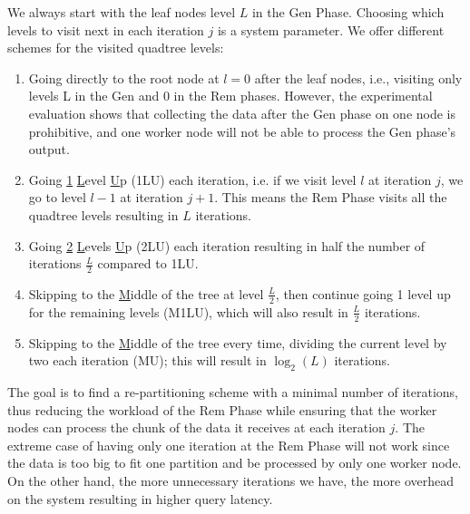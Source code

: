 We always start with the leaf nodes level $L$ in the Gen Phase. Choosing which levels to visit next in each iteration $j$ is a system parameter. 
We offer different schemes for the visited quadtree levels: 
\begin{enumerate}
    \item Going directly to the root node at $l=0$ after the leaf nodes, i.e., visiting only levels L in the Gen and 0 in the Rem phases. However, the experimental evaluation shows that collecting the data after the Gen phase on one node is prohibitive, and one worker node will not be able to process the Gen phase's output.
    \item Going \underline{1} \underline{L}evel \underline{U}p (1LU) each iteration, i.e. if we visit level $l$ at iteration $j$, we go to level $l-1$ at iteration $j+1$. This means the Rem Phase visits all the quadtree levels resulting in $L$ iterations.
    \item Going \underline{2} \underline{L}evels \underline{U}p (2LU) each iteration resulting in half the number of iterations $\frac{L}{2}$ compared to 1LU.
    \item Skipping to the \underline{M}iddle of the tree at level $\frac{L}{2}$, then continue going 1 level up for the remaining levels (M1LU), which will also result in $\frac{L}{2}$ iterations.
    \item Skipping to the \underline{M}iddle of the tree every time, dividing the current level by two each iteration (MU); this will result in $\log_2(L)$ iterations.
\end{enumerate}
The goal is to find a re-partitioning scheme with a minimal number of iterations, thus reducing the workload of the Rem Phase while ensuring that the worker nodes can process the chunk of the data it receives at each iteration $j$.
The extreme case of having only one iteration at the Rem Phase will not work since the data is too big to fit one partition and be processed by only one worker node. On the other hand, the more unnecessary iterations we have, the more overhead on the system resulting in higher query latency.